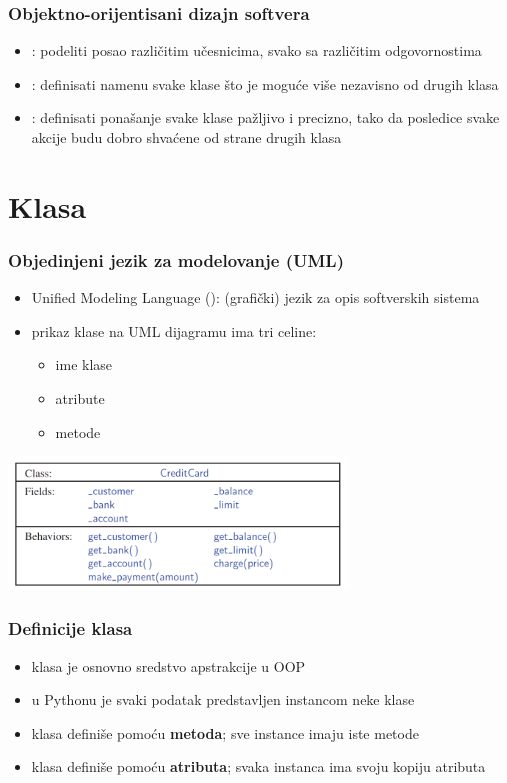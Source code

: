 \documentclass[compress]{beamer}
\begin{document}
\begin{frame}[fragile]
  \frametitle{Objektno-orijentisani dizajn softvera}
  \begin{itemize}
    \item {}: podeliti posao različitim učesnicima, svako sa različitim odgovornostima
    \item {}: definisati namenu svake klase što je moguće više nezavisno od drugih klasa
    \item {}: definisati ponašanje svake klase pažljivo i precizno, tako da posledice svake akcije budu dobro shvaćene od strane drugih klasa
  \end{itemize}
\end{frame}

\section[Klasa]{Klasa}
\begin{frame}[fragile]
  \frametitle{Objedinjeni jezik za modelovanje (UML)}
  \begin{itemize}
    \item Unified Modeling Language (): (grafički) jezik za opis softverskih sistema
    \item prikaz klase na UML dijagramu ima tri celine:
    \begin{itemize}
      \item ime klase
      \item atribute
      \item metode 
    \end{itemize}
  \end{itemize}
  \begin{center}
    \includegraphics[width=9cm]{asp-03-pic03.png}
  \end{center}
\end{frame}

\begin{frame}[fragile]
  \frametitle{Definicije klasa}
  \begin{itemize}
    \item klasa je osnovno sredstvo apstrakcije u OOP
    \item u Pythonu je svaki podatak predstavljen instancom neke klase
    \item klasa definiše  pomoću \textbf{metoda}; sve instance imaju iste metode
    \item klasa definiše  pomoću \textbf{atributa}; svaka instanca ima svoju kopiju atributa
  \end{itemize}
\end{frame}
\end{document}
